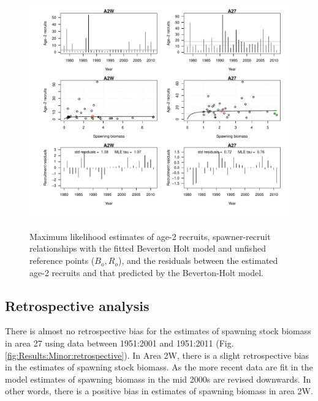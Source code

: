 \begin{figure}[!tbp]
	\includegraphics[width=\textwidth]{../FIGS/MinorAreas/iscam_fig_Recruitment.pdf}\\
	\caption{Maximum likelihood estimates of age-2 recruits, spawner-recruit relationships with the fitted Beverton Holt model and unfished reference points ($B_o, R_o$), and the residuals between the estimated age-2 recruits and that predicted by the Beverton-Holt model.}\label{Results:Minor:Recruitment}
\end{figure}

\subsection{Retrospective analysis}

There is almost no retrospective bias for the estimates of spawning stock biomass in area 27 using data between 1951:2001 and 1951:2011 (Fig. \ref{fig:Results:Minor:retrospective}).
In Area 2W, there is a slight retrospective bias in the estimates of spawning stock biomass.   As the more recent data are fit in the model estimates of spawning biomass in the mid 2000s are revised downwards.  In other words, there is a positive bias in estimates of spawning biomass in area 2W.

